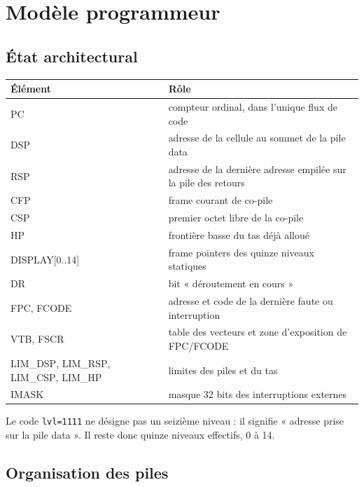 \documentclass[10pt,a4paper,twoside,openany]{book}
\newcommand{\code}[1]{\texttt{#1}}
\newcommand{\reg}[1]{\textsc{#1}}
\begin{document}
\chapter{Modèle programmeur}
\section{État architectural}
\begin{center}
\begin{tabularx}{\linewidth}{@{}lX@{}}
\toprule
\textbf{Élément} & \textbf{Rôle}\\ \midrule
\reg{PC} & compteur ordinal, dans l'unique flux de code \\
\reg{DSP} & adresse de la cellule au sommet de la pile data \\
\reg{RSP} & adresse de la dernière adresse empilée sur la pile des retours \\
\reg{CFP} & frame courant de co-pile \\
\reg{CSP} & premier octet libre de la co-pile \\
\reg{HP} & frontière basse du tas déjà alloué \\
\reg{DISPLAY[0..14]} & frame pointers des quinze niveaux statiques \\
\reg{DR} & bit « déroutement en cours » \\
\reg{FPC}, \reg{FCODE} & adresse et code de la dernière faute ou interruption \\
\reg{VTB}, \reg{FSCR} & table des vecteurs et zone d'exposition de \reg{FPC}/\reg{FCODE} \\
\reg{LIM\_DSP}, \reg{LIM\_RSP}, \reg{LIM\_CSP}, \reg{LIM\_HP} & limites des piles et du tas \\
\reg{IMASK} & masque 32 bits des interruptions externes \\
\bottomrule
\end{tabularx}
\end{center}
Le code \code{lvl=1111} ne désigne pas un seizième niveau : il signifie « adresse prise sur la pile data ». Il reste donc quinze niveaux effectifs, 0 à 14.

\section{Organisation des piles}
\begin{center}
\end{center}
\end{document}
